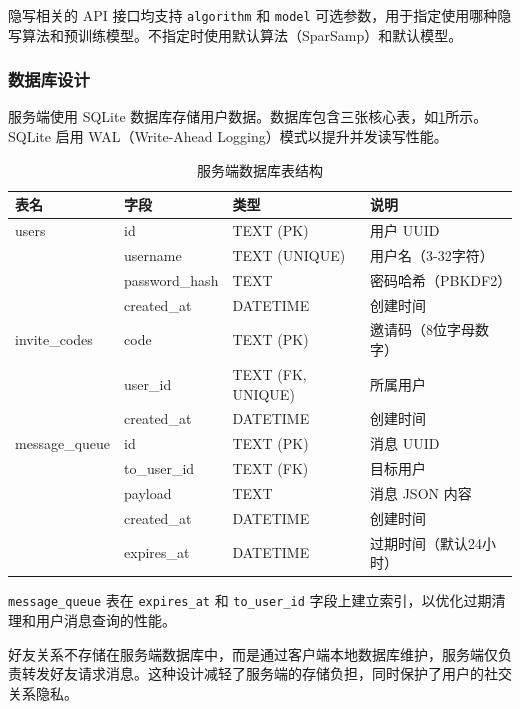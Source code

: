 隐写相关的 API 接口均支持 \texttt{algorithm} 和 \texttt{model} 可选参数，用于指定使用哪种隐写算法和预训练模型。不指定时使用默认算法（SparSamp）和默认模型。

\subsubsection{数据库设计}

服务端使用 SQLite 数据库存储用户数据。数据库包含三张核心表，如\cref{tab:db}所示。SQLite 启用 WAL（Write-Ahead Logging）模式以提升并发读写性能。

\begin{table}[htb!]
    \caption{服务端数据库表结构}
    \centering
    \begin{tabular}{llll}
        \hline
        \textbf{表名} & \textbf{字段} & \textbf{类型} & \textbf{说明} \\
        \hline
        users & id & TEXT (PK) & 用户 UUID \\
        & username & TEXT (UNIQUE) & 用户名（3-32字符） \\
        & password\_hash & TEXT & 密码哈希（PBKDF2） \\
        & created\_at & DATETIME & 创建时间 \\
        \hline
        invite\_codes & code & TEXT (PK) & 邀请码（8位字母数字） \\
        & user\_id & TEXT (FK, UNIQUE) & 所属用户 \\
        & created\_at & DATETIME & 创建时间 \\
        \hline
        message\_queue & id & TEXT (PK) & 消息 UUID \\
        & to\_user\_id & TEXT (FK) & 目标用户 \\
        & payload & TEXT & 消息 JSON 内容 \\
        & created\_at & DATETIME & 创建时间 \\
        & expires\_at & DATETIME & 过期时间（默认24小时） \\
        \hline
    \end{tabular}
    \label{tab:db}
\end{table}

\texttt{message\_queue} 表在 \texttt{expires\_at} 和 \texttt{to\_user\_id} 字段上建立索引，以优化过期清理和用户消息查询的性能。

好友关系不存储在服务端数据库中，而是通过客户端本地数据库维护，服务端仅负责转发好友请求消息。这种设计减轻了服务端的存储负担，同时保护了用户的社交关系隐私。

